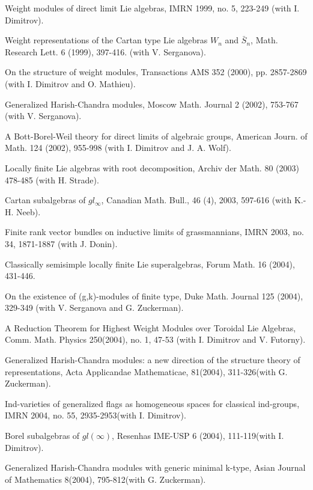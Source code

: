 \documentclass[11pt]{amsart}
\begin{document}
\myss \label{27.} Weight modules of direct limit Lie algebras,
IMRN 1999, no. 5, 223-249  (with I. Dimitrov).

\myss \label{28.} Weight representations of the Cartan type Lie
algebras $W_n$ and $\bar{S}_n$, Math. Research Lett. 6 (1999),
397-416. (with V. Serganova).

\myss \label{29.}  On the structure of weight modules,
Transactions AMS 352 (2000), pp. 2857-2869 (with I. Dimitrov and O.
Mathieu).

\myss \label{30.} Generalized Harish-Chandra modules, Moscow Math.
Journal 2 (2002), 753-767 (with V. Serganova).

\myss \label{31.} A Bott-Borel-Weil theory for direct limits of
algebraic groups, American Journ. of Math.  124 (2002), 955-998
(with I. Dimitrov and J. A. Wolf).

\myss \label{32.} Locally finite Lie algebras with root
decomposition, Archiv der Math. 80 (2003) 478-485 (with H.
Strade).

\myss \label{33.} Cartan subalgebras of $gl_{\infty}$, Canadian Math.
Bull., 46 (4), 2003, 597-616 (with K.-H. Neeb).

\myss \label{34.} Finite rank vector bundles on inductive limits of
grassmannians, IMRN 2003, no. 34, 1871-1887  (with J. Donin).

\myss \label{35.} Classically semisimple locally finite Lie
superalgebras, Forum Math. 16 (2004), 431-446.

\myss \label{36.} On the existence of (g,k)-modules of finite
type, Duke Math. Journal 125 (2004), 329-349
(with V. Serganova and G. Zuckerman).

\myss \label{37.} A Reduction Theorem for Highest Weight Modules
over Toroidal Lie Algebras, Comm. Math. Physics 250(2004), no. 1, 47-53 (with I. Dimitrov and V. Futorny).

\myss \label{38.} Generalized Harish-Chandra modules: a new direction of
the structure theory of representations, Acta Applicandae Mathematicae,
81(2004), 311-326(with G. Zuckerman).

\myss \label{39.} Ind-varieties of generalized flags as homogeneous
spaces for classical ind-groups, IMRN 2004, no. 55, 2935-2953(with I. Dimitrov).

\myss \label{40.} Borel subalgebras of $gl(\infty)$, Resenhas IME-USP 6 (2004), 111-119(with I. Dimitrov).

\myss \label{41.} Generalized Harish-Chandra modules with generic minimal k-type,
Asian Journal of Mathematics 8(2004), 795-812(with G. Zuckerman).
\end{document}
